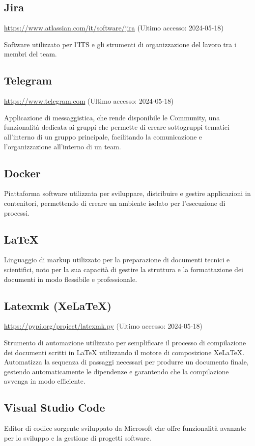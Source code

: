 \subsection{Jira}
\par \href{https://www.atlassian.com/it/software/jira}{https://www.atlassian.com/it/software/jira} (Ultimo accesso: 2024-05-18)
\par Software utilizzato per l'ITS e gli strumenti di organizzazione del lavoro tra i membri del team.
    
\subsection{Telegram}
\par \href{https://www.telegram.com}{https://www.telegram.com} (Ultimo accesso: 2024-05-18)
\par Applicazione di messaggistica, che rende disponibile le Community, una funzionalità dedicata ai gruppi che permette di creare sottogruppi tematici all'interno di un gruppo principale, facilitando la comunicazione e l'organizzazione all'interno di un team.
    
\subsection{Docker}
\par Piattaforma software utilizzata per sviluppare, distribuire e gestire applicazioni in contenitori, permettendo di creare un ambiente isolato per l'esecuzione di processi.
    
\subsection{LaTeX}
\par Linguaggio di markup utilizzato per la preparazione di documenti tecnici e scientifici, noto per la sua capacità di gestire la struttura e la formattazione dei documenti in modo flessibile e professionale.
    
\subsection{Latexmk (XeLaTeX)}
\par \href{https://pypi.org/project/latexmk.py/}{https://pypi.org/project/latexmk.py} (Ultimo accesso: 2024-05-18)
\par Strumento di automazione utilizzato per semplificare il processo di compilazione dei documenti scritti in LaTeX utilizzando il motore di composizione XeLaTeX. Automatizza la sequenza di passaggi necessari per produrre un documento finale, gestendo automaticamente le dipendenze e garantendo che la compilazione avvenga in modo efficiente.
    
\subsection{Visual Studio Code}
\par Editor di codice sorgente sviluppato da Microsoft che offre funzionalità avanzate per lo sviluppo e la gestione di progetti software.
